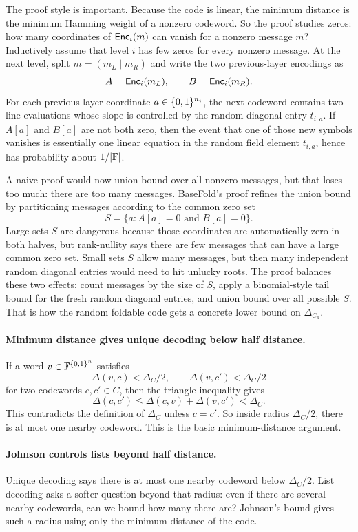 The proof style is important.  Because the code is linear, the minimum distance
is the minimum Hamming weight of a nonzero codeword.  So the proof studies zeros:
how many coordinates of $\mathsf{Enc}_i(m)$ can vanish for a nonzero message $m$?
Inductively assume that level $i$ has few zeros for every nonzero message.  At
the next level, split $m=(m_L\mid m_R)$ and write the two previous-layer
encodings as
\[
  A=\mathsf{Enc}_i(m_L),
  \qquad
  B=\mathsf{Enc}_i(m_R).
\]
For each previous-layer coordinate $a\in\{0,1\}^{n_i}$, the next codeword contains
two line evaluations whose slope is controlled by the random diagonal entry
$t_{i,a}$.  If $A[a]$ and $B[a]$ are not both zero, then the event that one of
those new symbols vanishes is essentially one linear equation in the random
field element $t_{i,a}$, hence has probability about $1/|\mathbb{F}|$.

A naive proof would now union bound over all nonzero messages, but that loses too
much: there are too many messages.  BaseFold's proof refines the union bound by
partitioning messages according to the common zero set
\[
  S=\{a:A[a]=0\text{ and }B[a]=0\}.
\]
Large sets $S$ are dangerous because those coordinates are automatically zero in
both halves, but rank-nullity says there are few messages that can have a large
common zero set.  Small sets $S$ allow many messages, but then many independent
random diagonal entries would need to hit unlucky roots.  The proof balances
these two effects: count messages by the size of $S$, apply a binomial-style
tail bound for the fresh random diagonal entries, and union bound over all
possible $S$.  That is how the random foldable code gets a concrete lower bound
on $\Delta_{C_d}$.

\paragraph{Minimum distance gives unique decoding below half distance.}
If a word $v\in\mathbb{F}^{\{0,1\}^n}$ satisfies
\[
  \Delta(v,c)<\Delta_C/2,
  \qquad
  \Delta(v,c')<\Delta_C/2
\]
for two codewords $c,c'\in C$, then the triangle inequality gives
\[
  \Delta(c,c')
  \le
  \Delta(c,v)+\Delta(v,c')
  <
  \Delta_C.
\]
This contradicts the definition of $\Delta_C$ unless $c=c'$.  So inside radius
$\Delta_C/2$, there is at most one nearby codeword.  This is the basic
minimum-distance argument.

\paragraph{Johnson controls lists beyond half distance.}
Unique decoding says there is at most one nearby codeword below
$\Delta_C/2$.  List decoding asks a softer question beyond that radius: even if
there are several nearby codewords, can we bound how many there are?  Johnson's
bound gives such a radius using only the minimum distance of the code.

